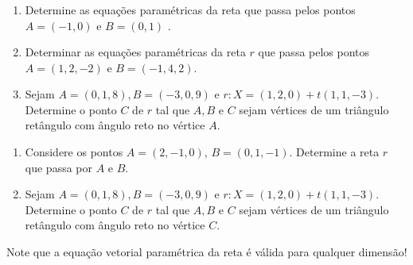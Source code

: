 \begin{frame}[label=retas]
	\frametitle{ }
	{\begin{exe}\label{exer4} \noindent
			
			\begin{enumerate}[a]
				\item Determine as equações paramétricas da reta que passa pelos pontos  $A=(-1,0)$ e $B=(0,1)$ .
				
				\item Determinar  as equações paramétricas da reta $r$ que passa pelos
				pontos $A = (1, 2, -2)$ e $B = (-1, 4, 2)$.

	\item\label{ex6} Sejam $A=(0,1,8), B=(-3,0,9)$ e $r: X=(1,2,0)+t(1,1,-3)$. Determine o ponto $C$ de $r$ tal que $A,B$ e $C$ sejam vértices de um triângulo retângulo com ângulo reto no vértice $A$.
			\end{enumerate}
	\end{exe}}

\end{frame}

\begin{frame}[label=retas]
	\begin{casa}
	\begin{enumerate}
		\item 	Considere os pontos $A = (2, -1, 0)$,  $B  = (0, 1, -1)$. Determine
	 a reta $r$ que passa por $A$ e $B$.

	\item Sejam $A=(0,1,8), B=(-3,0,9)$ e $r: X=(1,2,0)+t(1,1,-3)$. Determine o ponto $C$ de $r$ tal que $A,B$ e $C$ sejam vértices de um triângulo retângulo com ângulo reto no vértice $C$. 
	\end{enumerate}
	
	\end{casa}

	
\begin{center}
\begin{block}{}
Note que a equação vetorial paramétrica da reta é válida para qualquer dimensão!
\end{block}
\end{center}
\end{frame}

